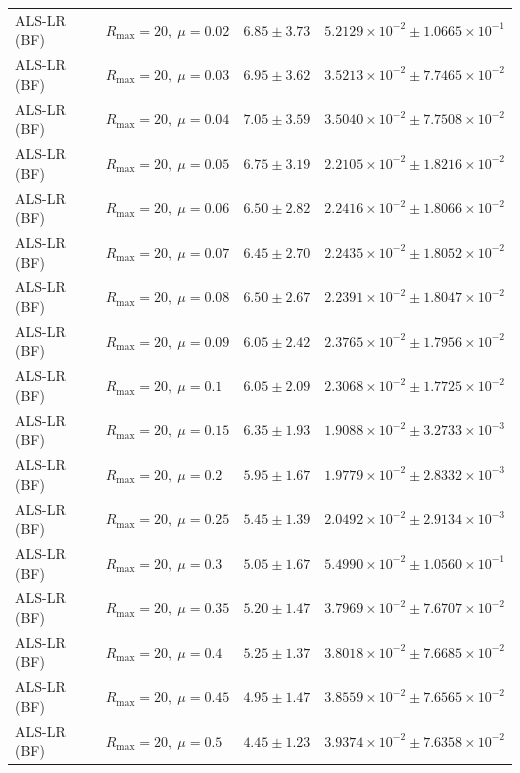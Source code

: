 \begin{table}[t]
\begin{tabular}{@{}llcc@{}}
ALS-LR (BF) & \(R_{\max}=20,\ \mu=0.02\) & \(6.85 \pm 3.73\) & \(5.2129{\times}10^{-2} \pm 1.0665{\times}10^{-1}\) \\
ALS-LR (BF) & \(R_{\max}=20,\ \mu=0.03\) & \(6.95 \pm 3.62\) & \(3.5213{\times}10^{-2} \pm 7.7465{\times}10^{-2}\) \\
ALS-LR (BF) & \(R_{\max}=20,\ \mu=0.04\) & \(7.05 \pm 3.59\) & \(3.5040{\times}10^{-2} \pm 7.7508{\times}10^{-2}\) \\
ALS-LR (BF) & \(R_{\max}=20,\ \mu=0.05\) & \(6.75 \pm 3.19\) & \(2.2105{\times}10^{-2} \pm 1.8216{\times}10^{-2}\) \\
ALS-LR (BF) & \(R_{\max}=20,\ \mu=0.06\) & \(6.50 \pm 2.82\) & \(2.2416{\times}10^{-2} \pm 1.8066{\times}10^{-2}\) \\
ALS-LR (BF) & \(R_{\max}=20,\ \mu=0.07\) & \(6.45 \pm 2.70\) & \(2.2435{\times}10^{-2} \pm 1.8052{\times}10^{-2}\) \\
ALS-LR (BF) & \(R_{\max}=20,\ \mu=0.08\) & \(6.50 \pm 2.67\) & \(2.2391{\times}10^{-2} \pm 1.8047{\times}10^{-2}\) \\
ALS-LR (BF) & \(R_{\max}=20,\ \mu=0.09\) & \(6.05 \pm 2.42\) & \(2.3765{\times}10^{-2} \pm 1.7956{\times}10^{-2}\) \\
ALS-LR (BF) & \(R_{\max}=20,\ \mu=0.1\) & \(6.05 \pm 2.09\) & \(2.3068{\times}10^{-2} \pm 1.7725{\times}10^{-2}\) \\
ALS-LR (BF) & \(R_{\max}=20,\ \mu=0.15\) & \(6.35 \pm 1.93\) & \(1.9088{\times}10^{-2} \pm 3.2733{\times}10^{-3}\) \\
ALS-LR (BF) & \(R_{\max}=20,\ \mu=0.2\) & \(5.95 \pm 1.67\) & \(1.9779{\times}10^{-2} \pm 2.8332{\times}10^{-3}\) \\
ALS-LR (BF) & \(R_{\max}=20,\ \mu=0.25\) & \(5.45 \pm 1.39\) & \(2.0492{\times}10^{-2} \pm 2.9134{\times}10^{-3}\) \\
ALS-LR (BF) & \(R_{\max}=20,\ \mu=0.3\) & \(5.05 \pm 1.67\) & \(5.4990{\times}10^{-2} \pm 1.0560{\times}10^{-1}\) \\
ALS-LR (BF) & \(R_{\max}=20,\ \mu=0.35\) & \(5.20 \pm 1.47\) & \(3.7969{\times}10^{-2} \pm 7.6707{\times}10^{-2}\) \\
ALS-LR (BF) & \(R_{\max}=20,\ \mu=0.4\) & \(5.25 \pm 1.37\) & \(3.8018{\times}10^{-2} \pm 7.6685{\times}10^{-2}\) \\
ALS-LR (BF) & \(R_{\max}=20,\ \mu=0.45\) & \(4.95 \pm 1.47\) & \(3.8559{\times}10^{-2} \pm 7.6565{\times}10^{-2}\) \\
ALS-LR (BF) & \(R_{\max}=20,\ \mu=0.5\) & \(4.45 \pm 1.23\) & \(3.9374{\times}10^{-2} \pm 7.6358{\times}10^{-2}\) \\

\end{tabular}
\end{table}
